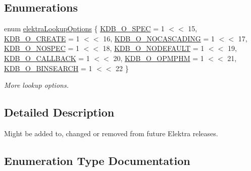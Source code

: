 \subsection*{Enumerations}
\begin{DoxyCompactItemize}
\item 
enum \mbox{\hyperlink{group__proposal_ga93673533c4c8eb1fdfca76b98c5f49b0}{elektra\+Lookup\+Options}} \{ \newline
\mbox{\hyperlink{group__proposal_gga93673533c4c8eb1fdfca76b98c5f49b0a187bc7e52493fb8f1eb5693015478dae}{K\+D\+B\+\_\+\+O\+\_\+\+S\+P\+EC}} = 1 $<$$<$ 15, 
\mbox{\hyperlink{group__proposal_gga93673533c4c8eb1fdfca76b98c5f49b0a72155bedec545b2e96372ab28169620a}{K\+D\+B\+\_\+\+O\+\_\+\+C\+R\+E\+A\+TE}} = 1 $<$$<$ 16, 
\mbox{\hyperlink{group__proposal_gga93673533c4c8eb1fdfca76b98c5f49b0abc4c6e04823b6d684f4db8df3b84f326}{K\+D\+B\+\_\+\+O\+\_\+\+N\+O\+C\+A\+S\+C\+A\+D\+I\+NG}} = 1 $<$$<$ 17, 
\mbox{\hyperlink{group__proposal_gga93673533c4c8eb1fdfca76b98c5f49b0a420d8ea3671ffea4fe8400570cfe5c8d}{K\+D\+B\+\_\+\+O\+\_\+\+N\+O\+S\+P\+EC}} = 1 $<$$<$ 18, 
\newline
\mbox{\hyperlink{group__proposal_gga93673533c4c8eb1fdfca76b98c5f49b0abdcfd6d28200b5c650615fba430496bb}{K\+D\+B\+\_\+\+O\+\_\+\+N\+O\+D\+E\+F\+A\+U\+LT}} = 1 $<$$<$ 19, 
\mbox{\hyperlink{group__proposal_gga93673533c4c8eb1fdfca76b98c5f49b0a70ac5d04d6f855e17e4c33dfeeddd39e}{K\+D\+B\+\_\+\+O\+\_\+\+C\+A\+L\+L\+B\+A\+CK}} = 1 $<$$<$ 20, 
\mbox{\hyperlink{group__proposal_gga93673533c4c8eb1fdfca76b98c5f49b0afe9f6ff6e374540baf600a918b07ee6e}{K\+D\+B\+\_\+\+O\+\_\+\+O\+P\+M\+P\+HM}} = 1 $<$$<$ 21, 
\mbox{\hyperlink{group__proposal_gga93673533c4c8eb1fdfca76b98c5f49b0ac67a43bd273203575090d26010f6c995}{K\+D\+B\+\_\+\+O\+\_\+\+B\+I\+N\+S\+E\+A\+R\+CH}} = 1 $<$$<$ 22
 \}
\begin{DoxyCompactList}\small\item\em More lookup options. \end{DoxyCompactList}\end{DoxyCompactItemize}


\subsection{Detailed Description}
Might be added to, changed or removed from future Elektra releases. 



\subsection{Enumeration Type Documentation}
\mbox{\label{group__proposal_ga93673533c4c8eb1fdfca76b98c5f49b0}} 

